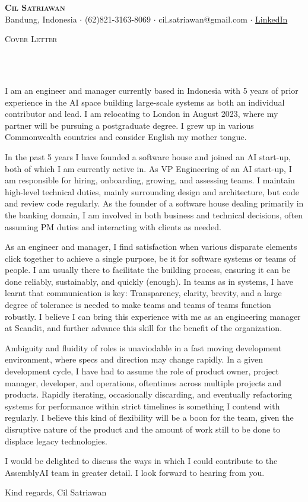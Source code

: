 \documentclass[11pt]{article}
\newcommand{\lineunder} {
    \vspace*{-8pt} \\
    \hspace*{-10pt} \hrulefill \\
}
\newcommand{\header} [1] {
    \begin{center}
      {\large \scshape {#1}}
      \lineunder
    \end{center}
    \vspace*{-8pt}
}
\newcommand{\profile} [5] {
    \vspace*{-15pt}
    \begin{center}
        {\huge \scshape \textbf{#1}}\\
        \vspace{1mm}
        \small {#2} $\cdot$ {#3} $\cdot$ {#4} $\cdot$ {#5}
    \end{center}
    \vspace*{-8pt}
}
\begin{document}
\vspace*{-40pt}

\profile{Cil Satriawan}{Bandung, Indonesia}{(62)821-3163-8069}
{cil.satriawan@gmail.com}{\href{https://www.linkedin.com/in/cil-satriawan-a60601111}{LinkedIn}}

\header{Cover Letter}
\vspace{1mm}

I am an engineer and manager currently based in Indonesia with 5 years of prior
experience in the AI space building large-scale systems as both an individual
contributor and lead. I am relocating to London in August 2023, where my
partner will be pursuing a postgraduate degree. I grew up in various Commonwealth
countries and consider English my mother tongue.
\vspace{3mm}

In the past 5 years I have founded a software house and joined an AI start-up,
both of which I am currently active in. As VP Engineering of an AI start-up,
I am responsible for hiring, onboarding, growing, and assessing teams. I maintain
high-level technical duties, mainly surrounding design and architecture, but code
and review code regularly. As the founder of a software house dealing primarily
in the banking domain, I am involved in both business and technical decisions,
often assuming PM duties and interacting with clients as needed.
\vspace{3mm}

As an engineer and manager, I find satisfaction when various disparate elements
click together to achieve a single purpose, be it for software systems or teams
of people. I am usually there to facilitate the building process, ensuring it
can be done reliably, sustainably, and quickly (enough). In teams as in systems,
I have learnt that communication is key: Transparency, clarity, brevity, and a
large degree of tolerance is needed to make teams and teams of teams function
robustly. I believe I can bring this experience with me as an engineering
manager at Scandit, and further advance this skill for the benefit of
the organization.
\vspace{3mm}

Ambiguity and fluidity of roles is unaviodable in a fast moving development
environment, where specs and direction may change rapidly. In a given
development cycle, I have had to assume the role of product owner, project
manager, developer, and operations, oftentimes across multiple projects and
products. Rapidly iterating, occasionally discarding, and eventually refactoring
systems for performance within strict timelines is something I contend with
regularly. I believe this kind of flexibility will be a boon for the team, given
the disruptive nature of the product and the amount of work still to be done to
displace legacy technologies.
\vspace{3mm}

I would be delighted to discuss the ways in which I could contribute to the
AssemblyAI team in greater detail. I look forward to hearing from you.
\vspace{3mm}

Kind regards,\newline
Cil Satriawan

\ 
\end{document}
